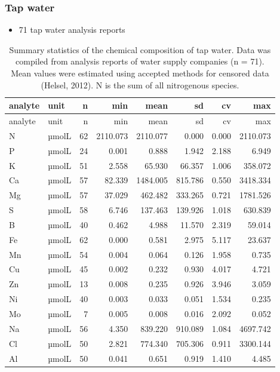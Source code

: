\documentclass[
]{article}
\providecommand{\tightlist}{%
  \setlength{\itemsep}{0pt}\setlength{\parskip}{0pt}}
\begin{document}
\hypertarget{tap-water}{%
\subsubsection{Tap water}\label{tap-water}}

\begin{itemize}
\tightlist
\item
  71 tap water analysis reports
\end{itemize}

\begin{longtable}[]{@{}llrrrrrr@{}}
\caption{Summary statistics of the chemical composition of tap water.
Data was compiled from analysis reports of water supply companies (n =
71). Mean values were estimated using accepted methods for censored data
(Helsel, 2012). N is the sum of all nitrogenous species.}\tabularnewline
\toprule\noalign{}
analyte & unit & n & min & mean & sd & cv & max \\
\midrule\noalign{}
\endfirsthead
\toprule\noalign{}
analyte & unit & n & min & mean & sd & cv & max \\
\midrule\noalign{}
\endhead
\bottomrule\noalign{}
\endlastfoot
N & µmolL & 62 & 2110.073 & 2110.077 & 0.000 & 0.000 & 2110.073 \\
P & µmolL & 24 & 0.001 & 0.888 & 1.942 & 2.188 & 6.949 \\
K & µmolL & 51 & 2.558 & 65.930 & 66.357 & 1.006 & 358.072 \\
Ca & µmolL & 57 & 82.339 & 1484.005 & 815.786 & 0.550 & 3418.334 \\
Mg & µmolL & 57 & 37.029 & 462.482 & 333.265 & 0.721 & 1781.526 \\
S & µmolL & 58 & 6.746 & 137.463 & 139.926 & 1.018 & 630.839 \\
B & µmolL & 40 & 0.462 & 4.988 & 11.570 & 2.319 & 59.014 \\
Fe & µmolL & 62 & 0.000 & 0.581 & 2.975 & 5.117 & 23.637 \\
Mn & µmolL & 54 & 0.004 & 0.064 & 0.126 & 1.958 & 0.735 \\
Cu & µmolL & 45 & 0.002 & 0.232 & 0.930 & 4.017 & 4.721 \\
Zn & µmolL & 13 & 0.008 & 0.235 & 0.926 & 3.946 & 3.059 \\
Ni & µmolL & 40 & 0.003 & 0.033 & 0.051 & 1.534 & 0.235 \\
Mo & µmolL & 7 & 0.005 & 0.008 & 0.016 & 2.092 & 0.052 \\
Na & µmolL & 56 & 4.350 & 839.220 & 910.089 & 1.084 & 4697.742 \\
Cl & µmolL & 50 & 2.821 & 774.340 & 705.306 & 0.911 & 3300.144 \\
Al & µmolL & 50 & 0.041 & 0.651 & 0.919 & 1.410 & 4.485 \\
\end{longtable}
\end{document}

